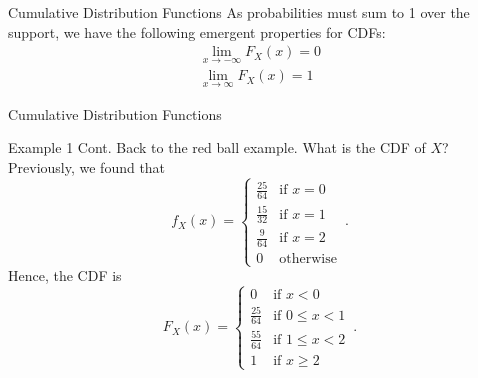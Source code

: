\documentclass[10pt]{beamer}
\begin{document}
\begin{frame}[fragile]{Cumulative Distribution Functions}
As probabilities must sum to 1 over the support, we have the following emergent properties for CDFs:
\begin{equation*}\begin{aligned}
    \lim_{x\rightarrow-\infty}F_X\left(x\right) = 0\\
    \lim_{x\rightarrow\infty}F_X\left(x\right) = 1
\end{aligned}\end{equation*}
\end{frame}

\begin{frame}[fragile]{Cumulative Distribution Functions}
\begin{exampleblock}{Example 1 Cont.}
Back to the red ball example. What is the CDF of \(X\)? Previously, we found that
\begin{equation*}
    f_X\left(x\right) =
    \begin{cases}
        \frac{25}{64} & \text{if } x = 0\\
        \frac{15}{32} & \text{if } x = 1\\
        \frac{9}{64} & \text{if } x = 2\\
        0 & \text{otherwise}
    \end{cases}\,.
\end{equation*}
Hence, the CDF is
\begin{equation*}
    F_X\left(x\right) =
    \begin{cases}
        0 & \text{if } x < 0\\
        \frac{25}{64} & \text{if } 0 \leq x < 1\\
        \frac{55}{64} & \text{if } 1 \leq x < 2\\
        1 & \text{if } x \geq 2
    \end{cases}\,.
\end{equation*}
\end{exampleblock}
\end{frame}
\end{document}
